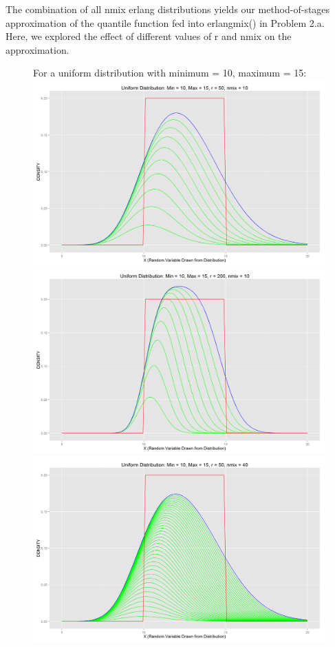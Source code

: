\documentclass[letter]{article}
\begin{document}
The combination of all nmix erlang distributions yields our method-of-stages approximation of the quantile function fed into erlangmix() in Problem 2.a.\\

Here, we explored the effect of different values of r and nmix on the approximation.\\

\begin{figure}[H]
\centering
\newpage
\Large{For a uniform distribution with minimum = 10, maximum = 15:}\\
\includegraphics[scale=.27]{unifdist_10_15_50_10.png}
\includegraphics[scale=.27]{unifdist_10_15_200_10.png}\\
\includegraphics[scale=.27]{unifdist_10_15_50_40.png}

\end{figure}
\end{document}
